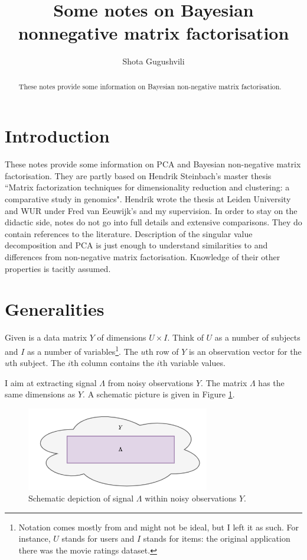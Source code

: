 \documentclass[]{article}
\title{Some notes on Bayesian nonnegative matrix factorisation}
\author{Shota Gugushvili}
\affil{Biometris, Wageningen University \&\ Research}
\begin{document}
\maketitle

\begin{abstract}
These notes provide some information on Bayesian non-negative matrix factorisation. 
\end{abstract}

\section{Introduction}

These notes provide some information on PCA and Bayesian non-negative matrix factorisation. They are partly based on Hendrik Steinbach's master thesis ``Matrix factorization techniques for dimensionality reduction and clustering: a comparative study in genomics". Hendrik wrote the thesis at Leiden University and WUR under Fred van Eeuwijk's and my supervision. In order to stay on the didactic side, notes do not go into full details and extensive comparisons. They do contain references to the literature. Description of the singular value decomposition and PCA is just enough to understand similarities to and differences from non-negative matrix factorisation. Knowledge of their other properties is tacitly assumed.

\section{Generalities}

Given is a data matrix $Y$ of dimensions $U \times I$. Think of $U$ as a number of subjects and $I$ as a number of variables\footnote{Notation comes mostly from \citet{kucukelbir2017} and might not be ideal, but I left it as such. For instance, $U$ stands for users and $I$ stands for items: the original application there was the movie ratings dataset.}. The $u$th row of $Y$ is an observation vector for the $u$th subject. The $i$th column contains the $i$th variable values.

I aim at extracting signal $\Lambda$ from noisy observations $Y$. The matrix $\Lambda$ has the same dimensions as $Y$. A schematic picture is given in Figure \ref{fig:signal_in_noise}.

\begin{figure}[h]
	\centering
	\includegraphics[width=8cm]{signal_in_noise.png}
	\caption{Schematic depiction of signal $\Lambda$ within noisy observations $Y$.}
	\label{fig:signal_in_noise}
\end{figure}
\end{document}
